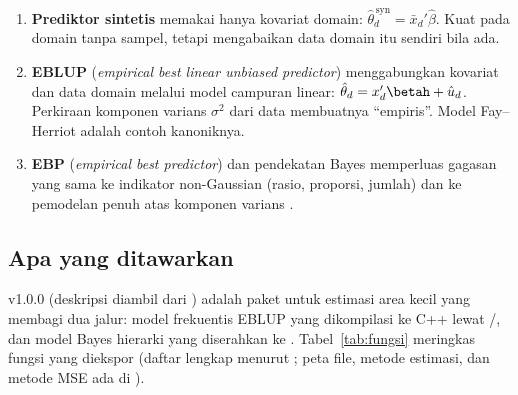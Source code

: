 \begin{enumerate}[label=(\alph*)]
  \item \textbf{Prediktor sintetis} memakai hanya kovariat domain:
        $\hat\theta_d^{\,\mathrm{syn}}=\bar x_d'\hat\beta$. Kuat pada domain
        tanpa sampel, tetapi mengabaikan data domain itu sendiri bila ada.
  \item \textbf{EBLUP} (\emph{empirical best linear unbiased predictor})
        menggabungkan kovariat dan data domain melalui model campuran linear:
        $\hat\theta_d=x_d'\betah+\hat u_d$. Perkiraan komponen varians
        $\sigma^2$ dari data membuatnya ``empiris''. Model Fay--Herriot
        \citep{fay1979small} adalah contoh kanoniknya.
  \item \textbf{EBP} (\emph{empirical best predictor}) dan pendekatan Bayes
        memperluas gagasan yang sama ke indikator non-Gaussian (rasio,
        proporsi, jumlah) dan ke pemodelan penuh atas komponen varians
        \citep{molina2010small, molina2015sae}.
\end{enumerate}

\subsection{Apa yang ditawarkan }

 v1.0.0 (deskripsi diambil dari ) adalah paket
 untuk estimasi area kecil yang membagi dua jalur: model frekuentis
EBLUP yang dikompilasi ke C++ lewat /, dan model
Bayes hierarki yang diserahkan ke . Tabel~\ref{tab:fungsi} meringkas
fungsi yang diekspor (daftar lengkap menurut ; peta file,
metode estimasi, dan metode MSE ada di ).

